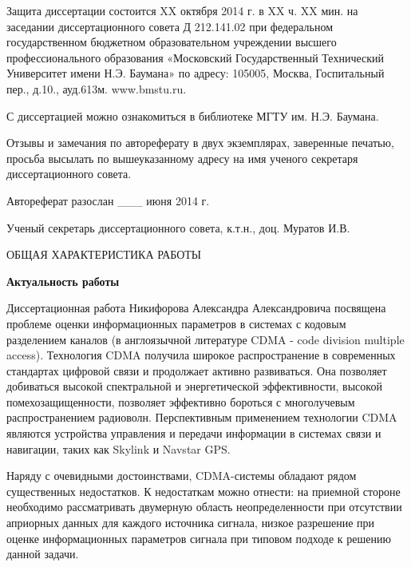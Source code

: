 \noindent
Защита диссертации состоится XX октября 2014 г. в XX ч. XX мин. на заседании диссертационного совета Д 212.141.02 при федеральном государственном бюджетном
образовательном учреждении высшего профессионального образования «Московский Государственный Технический Университет имени Н.Э. Баумана» по адресу: 105005, Москва,
Госпитальный пер., д.10., ауд.613м. www.bmstu.ru.

\noindent
С диссертацией можно ознакомиться в библиотеке МГТУ им. Н.Э. Баумана.

\noindent
Отзывы и замечания по автореферату в двух экземплярах, заверенные печатью, просьба высылать по вышеуказанному адресу на имя ученого секретаря диссертационного совета.

\noindent
Автореферат разослан \_\_\_ июня 2014 г.

\vfill
\noindent
Ученый секретарь диссертационного совета, 
к.т.н., доц. 	Муратов И.В. 

\newpage


{\bf\noindent\centerline{ОБЩАЯ ХАРАКТЕРИСТИКА РАБОТЫ}}

{\bf{Актуальность работы}}

Диссертационная работа Никифорова Александра Александровича посвящена проблеме оценки информационных параметров в системах с кодовым разделением каналов
(в англоязычной литературе CDMA - code division multiple access).
Технология CDMA получила широкое распространение в современных стандартах цифровой связи и продолжает активно развиваться. Она позволяет добиваться высокой
спектральной и энергетической эффективности, высокой помехозащищенности, позволяет эффективно бороться с многолучевым распространением радиоволн.
Перспективным применением технологии CDMA являются устройства управления и передачи информации в системах связи и навигации, таких как Skylink и Navstar GPS. 

Наряду с очевидными достоинствами, CDMA-системы обладают рядом существенных недостатков. К недостаткам можно отнести: на приемной стороне необходимо рассматривать
двумерную область неопределенности при отсутствии априорных данных для каждого источника сигнала, низкое разрешение при оценке информационных параметров сигнала при типовом подходе
к решению данной задачи.

